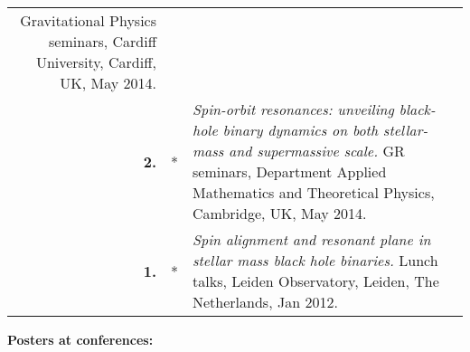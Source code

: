 \documentclass[11pt,letterpaper,sans]{moderncv}   %
\begin{document}
{\begin{longtable}{rp{0.4cm}p{15.8cm}}
\newline{} 
Gravitational Physics seminars, Cardiff University, Cardiff, UK, May 2014.
\vspace{0.05cm}\\
\textbf{2.} & *& \textit{Spin-orbit resonances: unveiling black-hole binary dynamics on both stellar-mass and supermassive scale.}
\newline{} 
GR seminars, Department Applied Mathematics and Theoretical Physics, Cambridge, UK, May 2014.
\vspace{0.05cm}\\
\textbf{1.} & *& \textit{Spin alignment and resonant plane in stellar mass black hole binaries.}
\newline{} 
Lunch talks, Leiden Observatory, Leiden, The Netherlands, Jan 2012.
\vspace{0.05cm}\\
\end{longtable}
}


\textcolor{color1}{\textbf{Posters at conferences:}}
\end{document}
